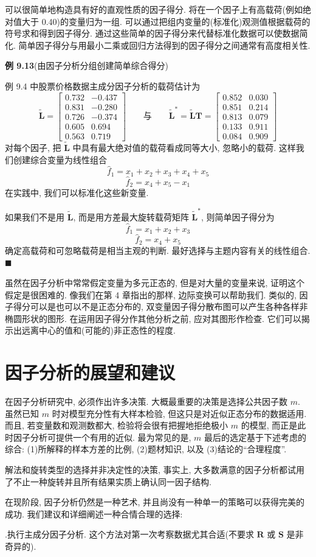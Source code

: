 
\quad 可以很简单地构造具有好的直观性质的因子得分. 将在一个因子上有高载荷(例如绝对值大于 0.40)的变量归为一组. 可以通过把组内变量的(标准化)观测值根据载荷的符号求和得到因子得分. 通过这些简单的因子得分来代替标准化数据可以使数据简化. 简单因子得分与用最小二乘或回归方法得到的因子得分之间通常有高度相关性.

\noindent\textbf{例 9.13}\quad (由因子分析分组创建简单综合得分)

例 9.4 中股票价格数据主成分因子分析的载荷估计为
\[
\tilde{\mathbf{L}}=
\begin{bmatrix}
0.732&-0.437\\
0.831&-0.280\\
0.726&-0.374\\
0.605&0.694\\
0.563&0.719
\end{bmatrix}
\qquad\text{与}\qquad
\tilde{\mathbf{L}}^*=\tilde{\mathbf{L}}\mathbf{T}=
\begin{bmatrix}
0.852&0.030\\
0.851&0.214\\
0.813&0.079\\
0.133&0.911\\
0.084&0.909
\end{bmatrix}
\]
对每个因子, 把 $\tilde{\mathbf{L}}$ 中具有最大绝对值的载荷看成同等大小, 忽略小的载荷. 这样我们创建综合变量为线性组合
\[
\hat{f}_1=x_1+x_2+x_3+x_4+x_5
\]
\[
\hat{f}_2=x_4+x_5-x_1
\]
在实践中, 我们可以标准化这些新变量.

如果我们不是用 $\tilde{\mathbf{L}}$, 而是用方差最大旋转载荷矩阵 $\tilde{\mathbf{L}}^*$, 则简单因子得分为
\[
\hat{f}_1=x_1+x_2+x_3
\]
\[
\hat{f}_2=x_4+x_5
\]
确定高载荷和可忽略载荷是相当主观的判断. 最好选择与主题内容有关的线性组合. \hfill$\blacksquare$

虽然在因子分析中常常假定变量为多元正态的, 但是对大量的变量来说, 证明这个假定是很困难的. 像我们在第 4 章指出的那样, 边际变换可以帮助我们. 类似的, 因子得分可以是也可以不是正态分布的, 双变量因子得分散布图可以产生各种各样非椭圆形状的图形. 在运用因子得分作其他分析之前, 应对其图形作检查. 它们可以揭示出远离中心的值和(可能的)非正态性的程度.

\section{因子分析的展望和建议}
\label{sec:9.6}

在因子分析研究中, 必须作出许多决策. 大概最重要的决策是选择公共因子数 $m$. 虽然已知 $m$ 时对模型充分性有大样本检验, 但这只是对近似正态分布的数据适用. 而且, 若变量数和观测数都大, 检验将会很有把握地拒绝极小 $m$ 的模型, 而正是此时因子分析可提供一个有用的近似. 最为常见的是, $m$ 最后的选定基于下述考虑的综合: (1)所解释的样本方差的比例, (2)题材知识, 以及 (3)结论的“合理程度”.

解法和旋转类型的选择并非决定性的决策, 事实上, 大多数满意的因子分析都试用了不止一种旋转并且所有结果实质上确认同一因子结构.

在现阶段, 因子分析仍然是一种艺术, 并且尚没有一种单一的策略可以获得完美的成功. 我们建议和详细阐述一种合情合理的选择:

.\quad 执行主成分因子分析. 这个方法对第一次考察数据尤其合适(不要求 $\mathbf{R}$ 或 $\mathbf{S}$ 是非奇异的).

